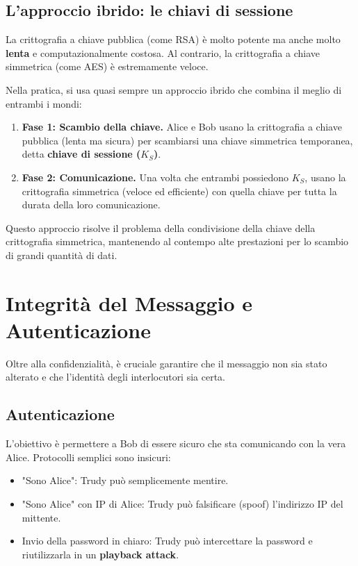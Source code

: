 
\subsection{L'approccio ibrido: le chiavi di sessione}

La crittografia a chiave pubblica (come RSA) è molto potente ma anche molto \textbf{lenta} e computazionalmente costosa. Al contrario, la crittografia a chiave simmetrica (come AES) è estremamente veloce.

Nella pratica, si usa quasi sempre un approccio ibrido che combina il meglio di entrambi i mondi:
\begin{enumerate}
    \item \textbf{Fase 1: Scambio della chiave.} Alice e Bob usano la crittografia a chiave pubblica (lenta ma sicura) per scambiarsi una chiave simmetrica temporanea, detta \textbf{chiave di sessione ($K_S$)}.
    \item \textbf{Fase 2: Comunicazione.} Una volta che entrambi possiedono $K_S$, usano la crittografia simmetrica (veloce ed efficiente) con quella chiave per tutta la durata della loro comunicazione.
\end{enumerate}

Questo approccio risolve il problema della condivisione della chiave della crittografia simmetrica, mantenendo al contempo alte prestazioni per lo scambio di grandi quantità di dati.
\section{Integrità del Messaggio e Autenticazione}
Oltre alla confidenzialità, è cruciale garantire che il messaggio non sia stato alterato e che l'identità degli interlocutori sia certa.

\subsection{Autenticazione}
L'obiettivo è permettere a Bob di essere sicuro che sta comunicando con la vera Alice. Protocolli semplici sono insicuri:
\begin{itemize}
    \item "Sono Alice": Trudy può semplicemente mentire.
    \item "Sono Alice" con IP di Alice: Trudy può falsificare (spoof) l'indirizzo IP del mittente.
    \item Invio della password in chiaro: Trudy può intercettare la password e riutilizzarla in un \textbf{playback attack}.
\end{itemize}

